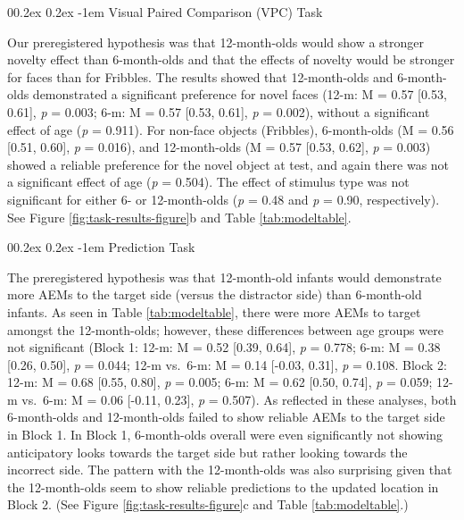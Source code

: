 \documentclass[
  english,
  man,floatsintext]{apa6}
\makeatletter
\let\oldparagraph\paragraph
\renewcommand{\paragraph}{
    \@ifstar
      \xxxParagraphStar
      \xxxParagraphNoStar
  }
\newcommand{\xxxParagraphStar}[1]{\oldparagraph*{#1}\mbox{}}
\newcommand{\xxxParagraphNoStar}[1]{\oldparagraph{#1}\mbox{}}
\renewcommand{\paragraph}{\@startsection{paragraph}{4}{\parindent}%
  {0\baselineskip \@plus 0.2ex \@minus 0.2ex}%
  {-1em}%
  {\normalfont\normalsize\bfseries\itshape\typesectitle}}
\makeatother
\begin{document}
\paragraph{Visual Paired Comparison (VPC) Task}\label{visual-paired-comparison-vpc-task}

Our preregistered hypothesis was that 12-month-olds would show a stronger novelty effect than 6-month-olds and that the effects of novelty would be stronger for faces than for Fribbles.
The results showed that 12-month-olds and 6-month-olds demonstrated a significant preference for novel faces (12-m: M = 0.57 {[}0.53, 0.61{]}, \emph{p} = 0.003; 6-m: M = 0.57 {[}0.53, 0.61{]}, \emph{p} = 0.002), without a significant effect of age (\emph{p} = 0.911).
For non-face objects (Fribbles), 6-month-olds (M = 0.56 {[}0.51, 0.60{]}, \emph{p} = 0.016), and 12-month-olds (M = 0.57 {[}0.53, 0.62{]}, \emph{p} = 0.003) showed a reliable preference for the novel object at test, and again there was not a significant effect of age (\emph{p} = 0.504).
The effect of stimulus type was not significant for either 6- or 12-month-olds (\emph{p} = 0.48 and \emph{p} = 0.90, respectively).
See Figure \ref{fig:task-results-figure}b and Table \ref{tab:modeltable}.

\paragraph{Prediction Task}\label{prediction-task}

The preregistered hypothesis was that 12-month-old infants would demonstrate more AEMs to the target side (versus the distractor side) than 6-month-old infants.
As seen in Table \ref{tab:modeltable}, there were more AEMs to target amongst the 12-month-olds; however, these differences between age groups were not significant (Block 1: 12-m: M = 0.52 {[}0.39, 0.64{]}, \emph{p} = 0.778; 6-m: M = 0.38 {[}0.26, 0.50{]}, \emph{p} = 0.044; 12-m vs.~6-m: M = 0.14 {[}-0.03, 0.31{]}, \emph{p} = 0.108.
Block 2: 12-m: M = 0.68 {[}0.55, 0.80{]}, \emph{p} = 0.005; 6-m: M = 0.62 {[}0.50, 0.74{]}, \emph{p} = 0.059; 12-m vs.~6-m: M = 0.06 {[}-0.11, 0.23{]}, \emph{p} = 0.507).
As reflected in these analyses, both 6-month-olds and 12-month-olds failed to show reliable AEMs to the target side in Block 1.
In Block 1, 6-month-olds overall were even significantly not showing anticipatory looks towards the target side but rather looking towards the incorrect side.
The pattern with the 12-month-olds was also surprising given that the 12-month-olds seem to show reliable predictions to the updated location in Block 2.
(See Figure \ref{fig:task-results-figure}c and Table \ref{tab:modeltable}.)
\end{document}

